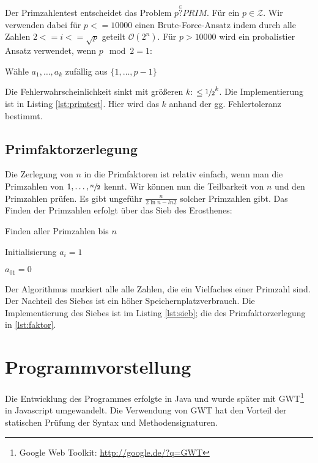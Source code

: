 \documentclass[11pt,a4paper]{scrartcl}
\begin{document}
Der Primzahlentest entscheidet das Problem $p \stackrel{\in}{?} PRIM$. Für ein $p\in \mathcal{Z}$.
Wir verwenden dabei für $p<=10000$ einen Brute-Force-Ansatz indem durch alle Zahlen $2<=i<= \sqrt{p}$ 
geteilt $\mathcal{O}(2^n)$. Für $p>10000$ wird ein probalistier Ansatz verwendet, wenn $p\mod 2=1$:

\begin{algorithm}[H]
	Wähle $a_1, \ldots, a_k$ zufällig aus $\{1, \ldots , p-1\}$\;
\end{algorithm}

Die Fehlerwahrscheinlichkeit sinkt mit größeren $k$: $ \le \sfrac{1}{2}^k$. Die Implementierung ist in Listing \ref{lst:primtest}. Hier wird das $k$ anhand der gg. Fehlertoleranz bestimmt.


\subsection{Primfaktorzerlegung}

Die Zerlegung von $n$ in die Primfaktoren ist relativ einfach, wenn man die Primzahlen von 
$1,\ldots ,\sfrac{n}{2}$ kennt. Wir können nun die Teilbarkeit von $n$ und den Primzahlen prüfen.
Es gibt ungeführ $\frac{n}{2 \ln n - ln 2}$ solcher Primzahlen gibt. Das Finden der Primzahlen erfolgt über das Sieb des Erosthenes:

\begin{algorithm}[H]
\caption{Finden aller Primzahlen bis $n$}
Initialisierung $a_i=1$\;

$a_{01}=0$\;

\end{algorithm}

Der Algorithmus markiert alle alle Zahlen, die ein Vielfaches einer Primzahl sind. 
Der Nachteil des Siebes ist ein höher Speichernplatzverbrauch. Die Implementierung des Siebes ist im Listing \ref{lst:sieb}; die des Primfaktorzerlegung in \ref{lst:faktor}.

\section{Programmvorstellung}

Die Entwicklung des Programmes erfolgte in Java und wurde später mit GWT\footnote{Google Web Toolkit: \url{http://google.de/?q=GWT}} in Javascript umgewandelt. Die Verwendung von GWT hat den Vorteil der statischen Prüfung der Syntax und Methodensignaturen.
\end{document}
